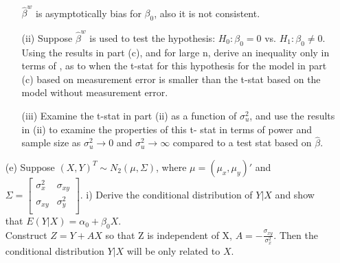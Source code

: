 \documentclass{homework}
\begin{document}
\begin{itemize}
\begin{itemize}
\begin{align*}
    \end{align*}      
    $\hat{\beta}^w$ is asymptotically bias for $\beta_0$, also it is not consistent.\\
    \item[(ii)] Suppose $\hat{\beta}^w$ is used to test the hypothesis: $H_0: \beta_0=0$ vs. $H_1: \beta_0 \neq 0$. Using the results in part (c), and for large n, derive an inequality only in terms of , as to when the t-stat for this hypothesis for the model in part (c) based on measurement error is smaller than the t-stat based on the model without measurement error.\\
    
    \item[(iii)] Examine the t-stat in part (ii) as a function of $\sigma_u^2$, and use the results in (ii) to examine the properties of this t- stat in terms of power and sample size as $\sigma_u^2 \rightarrow 0$ and $\sigma_u^2 \rightarrow \infty$ compared to a test stat based on $\hat{\beta}$.
    \end{itemize}
    \item[(e)] Suppose $(X,Y)^T \sim N_2(\mu, \Sigma)$, where $\mu= (\mu_x, \mu_y)'$ and $\Sigma = \begin{bmatrix}
           \sigma_x^2  &  \sigma_{xy}  \\
            \sigma_{xy} &   \sigma_{y}^2\\
         \end{bmatrix}$. i) Derive the conditional distribution of $Y|X$ and show that $E(Y|X) = \alpha_0 + \beta_0 X$. \\
         Construct $Z= Y+ AX$ so that Z is independent of X, $A= -\frac{\sigma_{xy}}{\sigma_x^2}$. Then the conditional distribution $Y|X$ will be only related to $X$.
    \end{itemize}
    
\end{document}
